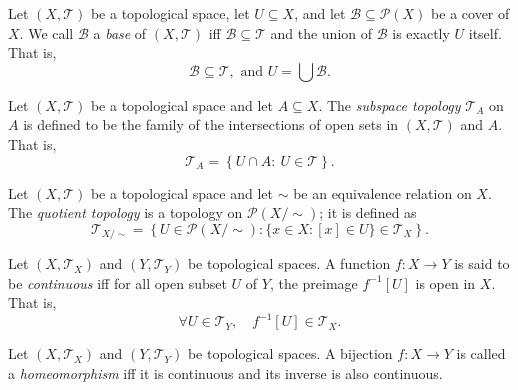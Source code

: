 \begin{definition}
	[Basis]
	\label{def: basis}
	Let $(X, \mathcal T)$ be a topological space, let $U \subseteq X$, and let $\mathcal B \subseteq \mathcal P(X)$ be a cover of $X$. We call $\mathcal B$ a \textit{base} of $(X, \mathcal T)$ iff $\mathcal B \subseteq \mathcal T$ and the union of $\mathcal B$ is exactly $U$ itself. That is,
	$$
	\mathcal B \subseteq \mathcal T, \text{ and } U = \bigcup \mathcal B.
	$$
\end{definition}


\begin{definition}
	\label{def: subspace topology}
	Let $(X, \mathcal T)$ be a topological space and let $A \subseteq X$. The \textit{subspace topology} $\mathcal T_A$ on $A$ is defined to be the family of the intersections of open sets in $(X, \mathcal T)$ and $A$. That is,
	$$
	\mathcal T_A = \left\{ U \cap A : \ U \in \mathcal T \right\}.
	$$
\end{definition}


\begin{definition}
	\label{def: quotient topology}
	Let $(X, \mathcal T)$ be a topological space and let $\sim$ be an equivalence relation on $X$. The \textit{quotient topology} is a topology on $\mathcal P(X/ \sim)$; it is defined as
	$$
	\mathcal T_{X / \sim} = \left\{ U \in \mathcal P(X/\sim) : \{ x \in X: [x] \in U \} \in \mathcal T_X \right\}.
	$$
\end{definition}


\begin{definition}
	\label{def: continuous functions}
	Let $(X, \mathcal T_X)$ and $(Y, \mathcal T_Y)$ be topological spaces. A function $f: X \to Y$ is said to be \textit{continuous} iff for all open subset $U$ of $Y$, the preimage $f^{-1}[U]$ is open in $X$. That is,
	$$
	\forall U \in \mathcal T_{Y}, \quad f^{-1}[U] \in \mathcal T_X.
	$$
\end{definition}


\begin{definition}
	[Homeomorphisms]
	\label{def: homomorphisms}
	Let $(X, \mathcal T_X)$ and $(Y, \mathcal T_Y)$ be topological spaces. A bijection $f: X \to Y$ is called a \textit{homeomorphism} iff it is continuous and its inverse is also continuous.
\end{definition}


